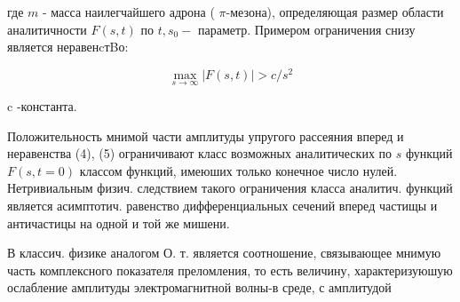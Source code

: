 \documentclass[10pt]{article}
\begin{document}
где $m$ - масса наилегчайшего адрона ( $\pi$-мезона), определяющая размер области аналитичности $F(s, t)$ по $t, s_{0}-$ параметр. Примером ограничения снизу является неравенcтBо:



\[

\max _{s \rightarrow \infty}|F(s, t)|>c / s^{2}

\]



c -константа.



Положительность мнимой части амплитуды упругого рассеяния вперед и неравенства (4), (5) ограничивают класс возможных аналитических по $s$ функций $F(s, t=0)$ классом функций, имеюших только конечное число нулей. Нетривиальным физич. следствием такого ограничения класса аналитич. функций является асимптотич. равенство дифференциальных сечений вперед частищы и античастицы на одной и той же мишени.



В классич. физике аналогом О. т. является соотношение, связывающее мнимую часть комплексного показателя преломления, то есть величину, характеризуюшую ослабление амплитуды электромагнитной волны-в среде, с амплитудой
\end{document}
